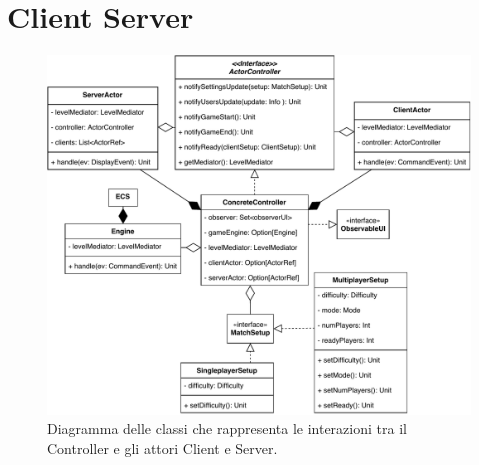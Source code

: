 \section{Client Server}
\label{sec:client_server_design}

\begin{figure}[H]
	\centering
	\includegraphics[width=0.99\columnwidth]{drawio/client-server/Controller-Actors-Interaction.pdf}
	\caption{Diagramma delle classi che rappresenta le interazioni tra il Controller e gli attori Client e Server.}
	\label{fig:Controller-Actors-Interaction}
\end{figure}



